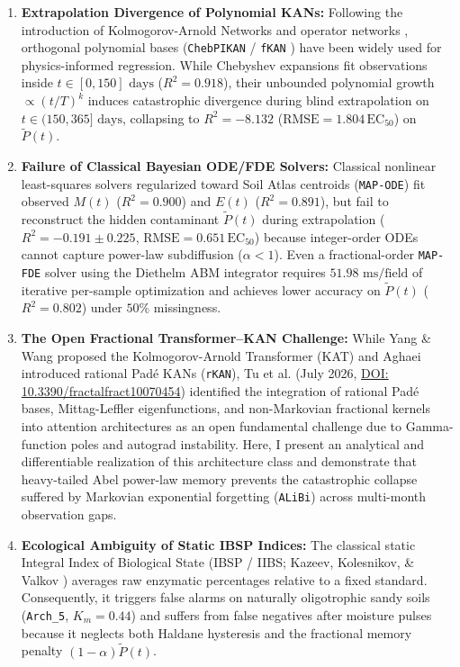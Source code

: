 \documentclass[10pt,twocolumn,a4paper]{article}
\begin{document}
\begin{enumerate}\setlength{\itemsep}{1pt}\setlength{\parskip}{0pt}
  \item \textbf{Extrapolation Divergence of Polynomial KANs:} Following the introduction of Kolmogorov-Arnold Networks \cite{liu2024kan} and operator networks \cite{abueidda2025deepokan}, orthogonal polynomial bases (\texttt{ChebPIKAN} / \texttt{fKAN} \cite{aghaei2024fkan}) have been widely used for physics-informed regression. While Chebyshev expansions fit observations inside $t \in [0, 150]\text{ days}$ ($R^2 = 0.918$), their unbounded polynomial growth $\propto (t/T)^k$ induces catastrophic divergence during blind extrapolation on $t \in (150, 365]\text{ days}$, collapsing to $R^2 = -8.132$ ($\text{RMSE} = 1.804\,\text{EC}_{50}$) on $\tilde{P}(t)$.
  \item \textbf{Failure of Classical Bayesian ODE/FDE Solvers:} Classical nonlinear least-squares solvers regularized toward Soil Atlas centroids (\texttt{MAP-ODE}) fit observed $M(t)$ ($R^2 = 0.900$) and $E(t)$ ($R^2 = 0.891$), but fail to reconstruct the hidden contaminant $\tilde{P}(t)$ during extrapolation ($R^2 = -0.191 \pm 0.225$, $\text{RMSE} = 0.651\,\text{EC}_{50}$) because integer-order ODEs cannot capture power-law subdiffusion ($\alpha < 1$). Even a fractional-order \texttt{MAP-FDE} solver using the Diethelm ABM integrator requires $51.98\text{ ms/field}$ of iterative per-sample optimization and achieves lower accuracy on $\tilde{P}(t)$ ($R^2 = 0.802$) under $50\%$ missingness.
  \item \textbf{The Open Fractional Transformer--KAN Challenge:} While Yang \& Wang \cite{yang2025kat} proposed the Kolmogorov-Arnold Transformer (KAT) and Aghaei \cite{aghaei2024rkan} introduced rational Pad\'e KANs (\texttt{rKAN}), Tu et al. \cite{tu2026fractional} (July 2026, \href{https://doi.org/10.3390/fractalfract10070454}{DOI: 10.3390/fractalfract10070454}) identified the integration of rational Pad\'e bases, Mittag-Leffler eigenfunctions, and non-Markovian fractional kernels into attention architectures as an open fundamental challenge due to Gamma-function poles and autograd instability. Here, I present an analytical and differentiable realization of this architecture class and demonstrate that heavy-tailed Abel power-law memory prevents the catastrophic collapse suffered by Markovian exponential forgetting (\texttt{ALiBi}) across multi-month observation gaps.
  \item \textbf{Ecological Ambiguity of Static IBSP Indices:} The classical static Integral Index of Biological State (IBSP / IIBS; Kazeev, Kolesnikov, \& Valkov \cite{kazeev2003bio,kolesnikov2021ag}) averages raw enzymatic percentages relative to a fixed standard. Consequently, it triggers false alarms on naturally oligotrophic sandy soils (\texttt{Arch\_5}, $K_m = 0.44$) and suffers from false negatives after moisture pulses because it neglects both Haldane hysteresis and the fractional memory penalty $(1-\alpha)\tilde{P}(t)$.
\end{enumerate}
\end{document}
